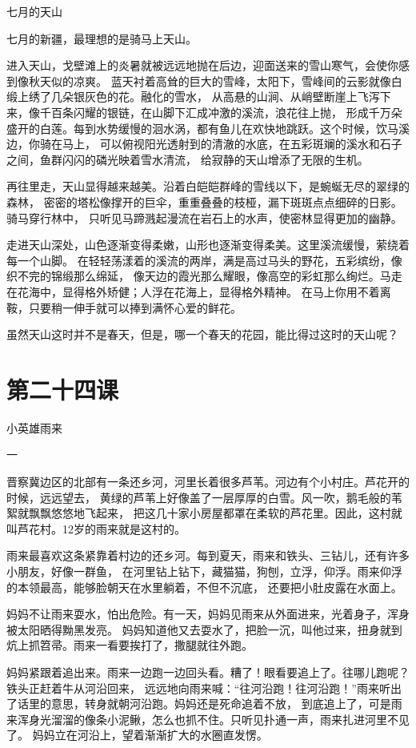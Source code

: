\documentclass[12pt,UTF8]{ctexbook}
\begin{document}
七月的天山

七月的新疆，最理想的是骑马上天山。

进入天山，戈壁滩上的炎暑就被远远地抛在后边，迎面送来的雪山寒气，会使你感到像秋天似的凉爽。
蓝天衬着高耸的巨大的雪峰，太阳下，雪峰间的云影就像白缎上绣了几朵银灰色的花。融化的雪水，
从高悬的山涧、从峭壁断崖上飞泻下来，像千百条闪耀的银链，在山脚下汇成冲激的溪流，浪花往上抛，
形成千万朵盛开的白莲。每到水势缓慢的洄水涡，都有鱼儿在欢快地跳跃。这个时候，饮马溪边，你骑在马上，
可以俯视阳光透射到的清澈的水底，在五彩斑斓的溪水和石子之间，鱼群闪闪的磷光映着雪水清流，
给寂静的天山增添了无限的生机。

再往里走，天山显得越来越美。沿着白皑皑群峰的雪线以下，是蜿蜒无尽的翠绿的森林，
密密的塔松像撑开的巨伞，重重叠叠的枝桠，漏下斑斑点点细碎的日影。骑马穿行林中，
只听见马蹄溅起漫流在岩石上的水声，使密林显得更加的幽静。

走进天山深处，山色逐渐变得柔嫩，山形也逐渐变得柔美。这里溪流缓慢，萦绕着每一个山脚。
在轻轻荡漾着的溪流的两岸，满是高过马头的野花，五彩缤纷，像织不完的锦缎那么绵延，
像天边的霞光那么耀眼，像高空的彩虹那么绚烂。马走在花海中，显得格外矫健；人浮在花海上，显得格外精神。
在马上你用不着离鞍，只要稍一伸手就可以捧到满怀心爱的鲜花。

虽然天山这时并不是春天，但是，哪一个春天的花园，能比得过这时的天山呢？

\section{第二十四课}

小英雄雨来

一

晋察冀边区的北部有一条还乡河，河里长着很多芦苇。河边有个小村庄。芦花开的时候，远远望去，
黄绿的芦苇上好像盖了一层厚厚的白雪。风一吹，鹅毛般的苇絮就飘飘悠悠地飞起来，
把这几十家小房屋都罩在柔软的芦花里。因此，这村就叫芦花村。12岁的雨来就是这村的。

雨来最喜欢这条紧靠着村边的还乡河。每到夏天，雨来和铁头、三钻儿，还有许多小朋友，好像一群鱼，
在河里钻上钻下，藏猫猫，狗刨，立浮，仰浮。雨来仰浮的本领最高，能够脸朝天在水里躺着，不但不沉底，
还要把小肚皮露在水面上。

妈妈不让雨来耍水，怕出危险。有一天，妈妈见雨来从外面进来，光着身子，浑身被太阳晒得黝黑发亮。
妈妈知道他又去耍水了，把脸一沉，叫他过来，扭身就到炕上抓笤帚。雨来一看要挨打了，撒腿就往外跑。

妈妈紧跟着追出来。雨来一边跑一边回头看。糟了！眼看要追上了。往哪儿跑呢？铁头正赶着牛从河沿回来，
远远地向雨来喊：“往河沿跑！往河沿跑！”雨来听出了话里的意思，转身就朝河沿跑。妈妈还是死命追着不放，
到底追上了，可是雨来浑身光溜溜的像条小泥鳅，怎么也抓不住。只听见扑通一声，雨来扎进河里不见了。
妈妈立在河沿上，望着渐渐扩大的水圈直发愣。
\end{document}
